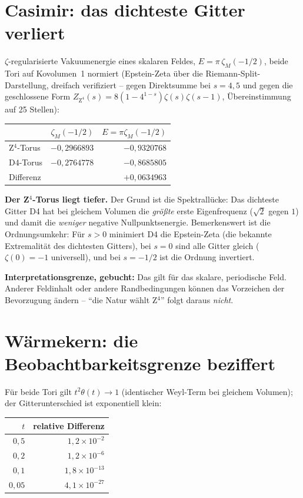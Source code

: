 \section{Casimir: das dichteste Gitter verliert}

$\zeta$-regularisierte Vakuumenergie eines skalaren Feldes,
$E = \pi\,\zeta_M(-1/2)$, beide Tori auf Kovolumen~1 normiert
(Epstein-Zeta über die Riemann-Split-Darstellung, dreifach
verifiziert -- gegen Direktsumme bei $s = 4, 5$ und gegen die
geschlossene Form $Z_{\text{Z}^4}(s) = 8(1-4^{1-s})\zeta(s)\zeta(s-1)$,
Übereinstimmung auf 25 Stellen):

\begin{center}
\begin{tabular}{lrr}
\toprule
 & $\zeta_M(-1/2)$ & $E = \pi\zeta_M(-1/2)$ \\
\midrule
Z$^4$-Torus & $-0{,}2966893$ & $-0{,}9320768$ \\
D4-Torus & $-0{,}2764778$ & $-0{,}8685805$ \\
\midrule
Differenz & & $+0{,}0634963$ \\
\bottomrule
\end{tabular}
\end{center}

\textbf{Der Z$^4$-Torus liegt tiefer.} Der Grund ist die
Spektrallücke: Das dichteste Gitter D4 hat bei gleichem Volumen die
\emph{größte} erste Eigenfrequenz ($\sqrt2$ gegen $1$) und damit die
\emph{weniger} negative Nullpunktsenergie. Bemerkenswert ist die
Ordnungsumkehr: Für $s > 0$ minimiert D4 die Epstein-Zeta (die
bekannte Extremalität des dichtesten Gitters), bei $s = 0$ sind alle
Gitter gleich ($\zeta(0) = -1$ universell), und bei $s = -1/2$ ist
die Ordnung invertiert.

\textbf{Interpretationsgrenze, gebucht:} Das gilt für das skalare,
periodische Feld. Anderer Feldinhalt oder andere Randbedingungen
können das Vorzeichen der Bevorzugung ändern --
\enquote{die Natur wählt Z$^4$} folgt daraus \emph{nicht}.

\section{Wärmekern: die Beobachtbarkeitsgrenze beziffert}

Für beide Tori gilt $t^2\theta(t) \to 1$ (identischer Weyl-Term bei
gleichem Volumen); der Gitterunterschied ist exponentiell klein:

\begin{center}
\begin{tabular}{rr}
\toprule
$t$ & relative Differenz \\
\midrule
$0{,}5$ & $1{,}2\times10^{-2}$ \\
$0{,}2$ & $1{,}2\times10^{-6}$ \\
$0{,}1$ & $1{,}8\times10^{-13}$ \\
$0{,}05$ & $4{,}1\times10^{-27}$ \\
\bottomrule
\end{tabular}
\end{center}

